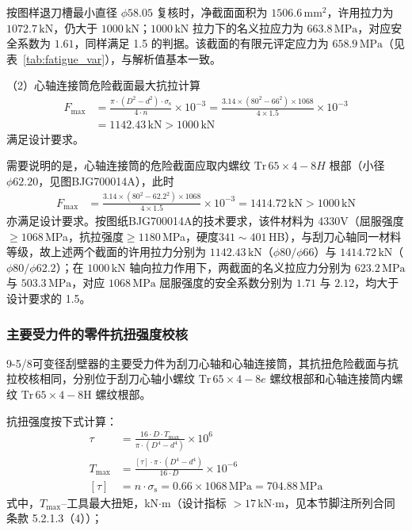 按图样退刀槽最小直径 $\phi 58.05$ 复核时，净截面面积为 $1506.6\,\mathrm{mm^{2}}$，许用拉力为 $1072.7\,\mathrm{kN}$，仍大于 $1000\,\mathrm{kN}$；$1000\,\mathrm{kN}$ 拉力下的名义拉应力为 $663.8\,\mathrm{MPa}$，对应安全系数为 $1.61$，同样满足 1.5 的判据。该截面的有限元评定应力为 $658.9\,\mathrm{MPa}$（见表~\ref{tab:fatigue_var}），与解析值基本一致。

（2）心轴连接筒危险截面最大抗拉计算
\begin{equation}
    \begin{aligned}
    F_{\max} &= \frac{\pi \cdot (D^2 - d^2) \cdot \sigma_{\mathrm{s}}}{4 \cdot n} \times 10^{-3}
             = \frac{3.14 \times (80^2 - 66^2) \times 1068}{4 \times 1.5} \times 10^{-3} \\
             &= 1142.43\,\mathrm{kN} > 1000\,\mathrm{kN}
    \end{aligned}
\end{equation}
满足设计要求。

需要说明的是，心轴连接筒的危险截面应取内螺纹 $\mathrm{Tr}\,65\times4-8H$ 根部（小径 $\phi 62.20$，见图BJG700014A），此时
\begin{equation}
    \begin{aligned}
    F_{\max} &= \frac{3.14 \times (80^2 - 62.2^2) \times 1068}{4 \times 1.5} \times 10^{-3}
             = 1414.72\,\mathrm{kN} > 1000\,\mathrm{kN}
    \end{aligned}
\end{equation}
亦满足设计要求。按图纸BJG700014A的技术要求，该件材料为 4330V（屈服强度$\ge 1068$\,MPa，抗拉强度$\ge 1180$\,MPa，硬度$341\sim401$\,HB），与刮刀心轴同一材料等级，故上述两个截面的许用拉力分别为 $1142.43\,\mathrm{kN}$（$\phi 80/\phi 66$）与 $1414.72\,\mathrm{kN}$（$\phi 80/\phi 62.2$）；在 $1000\,\mathrm{kN}$ 轴向拉力作用下，两截面的名义拉应力分别为 $623.2\,\mathrm{MPa}$ 与 $503.3\,\mathrm{MPa}$，对应 $1068\,\mathrm{MPa}$ 屈服强度的安全系数分别为 $1.71$ 与 $2.12$，均大于设计要求的 1.5。


\subsubsection{主要受力件的零件抗扭强度校核}\label{sec:torsion-var}

9-5/8\inch 可变径刮壁器的主要受力件为刮刀心轴和心轴连接筒，其抗扭危险截面与抗拉校核相同，分别位于刮刀心轴小螺纹 $\mathrm{Tr}\,65 \times 4-8e$ 螺纹根部和心轴连接筒内螺纹 $\mathrm{Tr}\,65 \times 4-8\mathrm{H}$ 螺纹根部。

抗扭强度按下式计算：
\begin{equation}
    \begin{aligned}
        \tau &= \frac{16 \cdot D \cdot T_{\max}}{\pi \cdot (D^4 - d^4)} \times 10^{6} \\
        T_{\max} &= \frac{[\tau] \cdot \pi \cdot (D^4 - d^4)}{16 \cdot D} \times 10^{-6} \\
        [\tau] &= n \cdot \sigma_{\mathrm{s}} = 0.66 \times 1068\,\mathrm{MPa} = 704.88\,\mathrm{MPa}
    \end{aligned}
\end{equation}
式中，$T_{\max}$--工具最大扭矩，kN$\cdot$m（设计指标 $>17$\,kN$\cdot$m，见本节脚注所列合同条款 5.2.1.3（4））；

